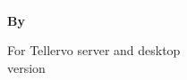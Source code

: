\begin{titlepage}
\AddToShipoutPicture*{\BackgroundPic}




\includegraphics{Images/pixel.png}\\[187mm] 
{
\raggedleft
\Large \textbf{By \authornames}\\
}

\vfill
{
\large For Tellervo server and desktop\\
version \versionnumber\\[4mm]
}



\end{titlepage}